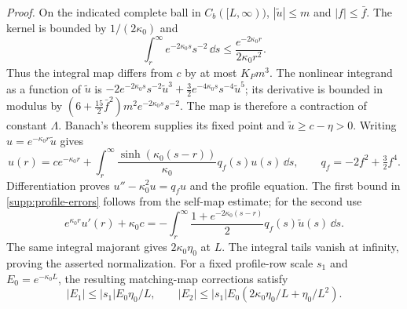\noindent\emph{Proof.}
On the indicated complete ball in $C_b([L,\infty))$, $|\widetilde u|\leq m$
and $|f|\leq\bar f$. The kernel is bounded by $1/(2\kappa_0)$ and
\begin{equation}
 \int_r^\infty e^{-2\kappa_0s}s^{-2}\,\dd s
 \leq\frac{e^{-2\kappa_0r}}{2\kappa_0r^2}.
\end{equation}
Thus the integral map differs from $c$ by at most $K_Pm^3$. The
nonlinear integrand as a function of $\widetilde u$ is
$-2e^{-2\kappa_0s}s^{-2}\widetilde u^3+
\tfrac32e^{-4\kappa_0s}s^{-4}\widetilde u^5$; its derivative is bounded
in modulus by $(6+\tfrac{15}{2}\bar f^2)m^2e^{-2\kappa_0s}s^{-2}$.
The map is therefore a contraction of constant $\Lambda$.
Banach's theorem supplies its fixed point and $\widetilde u\geq c-\eta>0$.
Writing $u=e^{-\kappa_0r}\widetilde u$ gives
\begin{equation}
 u(r)=ce^{-\kappa_0r}+\int_r^\infty
 \frac{\sinh(\kappa_0(s-r))}{\kappa_0}q_f(s)u(s)\,\dd s,
 \qquad q_f=-2f^2+\tfrac32f^4.
\end{equation}
Differentiation proves $u''-\kappa_0^2u=q_fu$ and the profile equation.
The first bound in \eqref{supp:profile-errors} follows from the
self-map estimate; for the second use
\begin{equation}
 e^{\kappa_0r}u'(r)+\kappa_0c
 =-\int_r^\infty\frac{1+e^{-2\kappa_0(s-r)}}{2}
                   q_f(s)\widetilde u(s)\,\dd s.
\end{equation}
The same integral majorant gives $2\kappa_0\eta_0$ at $L$.
The integral tails vanish at infinity, proving the asserted normalization.
For a fixed profile-row scale $s_1$ and $E_0=e^{-\kappa_0L}$,
the resulting matching-map corrections satisfy
\begin{equation}
 |E_1|\leq |s_1|E_0\eta_0/L,\qquad
 |E_2|\leq |s_1|E_0(2\kappa_0\eta_0/L+\eta_0/L^2).
\end{equation}

